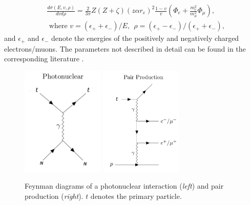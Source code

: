 \begin{equation}
\begin{split}
&\frac{d\sigma(E,v,\rho)}{dvd\rho} = \frac{2}{3\pi} Z(Z+\zeta)(z \alpha r_e)^2 \frac{1-v}{v} \left(\Phi_e + \frac{m_e^2}{m_\mu^2} \Phi_\mu \right), \\
& \textrm{ where \ \ } v = (\epsilon_+ + \epsilon_-)/E, \ \ \rho = (\epsilon_+ - \epsilon_-)/(\epsilon_+ + \epsilon_-),
\end{split}
\end{equation}
and $\epsilon_+$ and $\epsilon_-$ denote the energies of the positively and negatively charged electrons/muons. The parameters not described in detail can be found in the corresponding literature \cite{Chirkin:2004hz}.

\begin{figure}
\centering
\includegraphics[width = 0.35\textwidth]{chapter4/img/Feynman_PhotoNuclear_2.png}
\includegraphics[width = 0.35\textwidth]{chapter4/img/Feynman_PairProduction_2.png}
\caption{Feynman diagrams of a photonuclear interaction (\textit{left}) and pair production (\textit{right}). $t$ denotes the primary particle.}
\label{fig:feynmannuclpairprod}
\end{figure}

